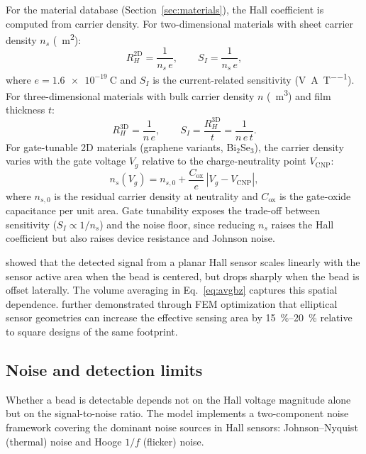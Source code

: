 \documentclass[pdflatex,sn-basic]{sn-jnl}
\theoremstyle{thmstyleone}
\theoremstyle{thmstyletwo}
\theoremstyle{thmstylethree}
\begin{document}
For the material database (Section~\ref{sec:materials}), the Hall coefficient is computed from carrier density. For two-dimensional materials with sheet carrier density $n_s$ (\si{\per\meter\squared}):
\begin{equation}
R_H^{\text{2D}} = \frac{1}{n_s\, e}, \qquad S_I = \frac{1}{n_s\, e},
\label{eq:rh2d}
\end{equation}
where $e = \SI{1.6e-19}{\coulomb}$ and $S_I$ is the current-related sensitivity (\si{\volt\per\ampere\per\tesla}). For three-dimensional materials with bulk carrier density $n$ (\si{\per\meter\cubed}) and film thickness $t$:
\begin{equation}
R_H^{\text{3D}} = \frac{1}{n\, e}, \qquad S_I = \frac{R_H^{\text{3D}}}{t} = \frac{1}{n\, e\, t}.
\label{eq:rh3d}
\end{equation}
For gate-tunable 2D materials (graphene variants, Bi$_2$Se$_3$), the carrier density varies with the gate voltage $V_g$ relative to the charge-neutrality point $V_{\text{CNP}}$:
\begin{equation}
n_s(V_g) = n_{s,0} + \frac{C_{\text{ox}}}{e}\,|V_g - V_{\text{CNP}}|,
\label{eq:gate}
\end{equation}
where $n_{s,0}$ is the residual carrier density at neutrality and $C_{\text{ox}}$ is the gate-oxide capacitance per unit area. Gate tunability exposes the trade-off between sensitivity ($S_I \propto 1/n_s$) and the noise floor, since reducing $n_s$ raises the Hall coefficient but also raises device resistance and Johnson noise.

\citet{tu2009} showed that the detected signal from a planar Hall sensor scales linearly with the sensor active area when the bead is centered, but drops sharply when the bead is offset laterally. The volume averaging in Eq.~\eqref{eq:avgbz} captures this spatial dependence. \citet{uddin2022} further demonstrated through FEM optimization that elliptical sensor geometries can increase the effective sensing area by \SIrange{15}{20}{\percent} relative to square designs of the same footprint.

\subsection{Noise and detection limits}\label{sec:noise}

Whether a bead is detectable depends not on the Hall voltage magnitude alone but on the signal-to-noise ratio. The model implements a two-component noise framework covering the dominant noise sources in Hall sensors: Johnson--Nyquist (thermal) noise and Hooge $1/f$ (flicker) noise.
\end{document}

